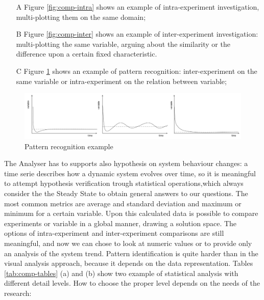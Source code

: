\begin{enumerate}
\item[A] Figure \ref{fig:comp-intra} shows an example of intra-experiment investigation, multi-plotting them on the same domain; 
\item[B] Figure \ref{fig:comp-inter} shows an example of inter-experiment investigation: multi-plotting the same variable, arguing about the similarity or the difference upon a certain fixed characteristic.  
\item[C] Figure \ref{fig:patterns}  shows an example of pattern recognition: inter-experiment on the same variable or intra-experiment on the relation between variable;
\end{enumerate}

\begin{figure}[tbh]
  \centering
	\includegraphics[width=0.85\linewidth]{images/patterns}
	\caption{Pattern recognition example} 
  	\label{fig:patterns}
\end{figure}

\pagebreak

The Analyser has to supports also hypothesis on system behaviour changes: a time serie describes how a dynamic system evolves over time, so it is meaningful to attempt hypothesis verification trough statistical operations,which always consider the the Steady State to obtain general answers to our questions. The most common metrics are average and standard deviation and maximum or minimum for a certain variable. Upon this calculated data is possible to compare experiments or variable in a global manner, drawing a solution space. 
The options of intra-experiment and inter-experiment comparisons are still meaningful, and now we can chose to look at numeric values or to provide only an analysis of the system trend. Pattern identification is quite harder than in the visual analysis approach, because it depends on the data representation. Tables \ref{tab:comp-tables} (a) and (b) show two example of statistical analysis with different detail levels. How to choose the proper level depends on the needs of the research:


